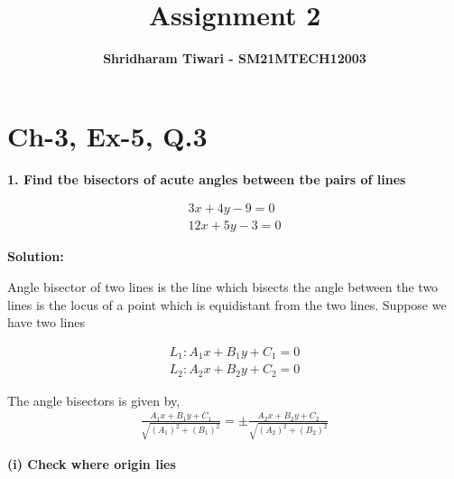 \documentclass[journal,12pt,twocolumn]{IEEEtran}
\title{\textbf{\Huge Assignment 2}}
\author{\textbf{\Large Shridharam Tiwari - SM21MTECH12003}}
\begin{document}
 



\providecommand{\mbf}{\mathbf}
\providecommand{\norm}[1]{\left\lVert#1\right\rVert}
\newcommand{\myvec}[1]{\ensuremath{\begin{pmatrix}#1\end{pmatrix}}}
\let\vec\mathbf

\maketitle



\section*{Ch-3, Ex-5, Q.3}
\vspace{0.35cm}



\textbf{1. Find tbe bisectors of acute angles between tbe pairs of
lines\\
\vspace{0.1cm} }

\begin{align}
3x+4y-9=0  \\ 12x+5y-3=0
\end{align}


\vspace{0.1cm}

\textbf{Solution:}  

\vspace{0.2cm}
Angle bisector of two lines is the line which bisects the angle between the two lines is the locus of a point which is equidistant from the two lines. Suppose we have two lines 

\begin{align}
L_1 : A_1x + B_1y + C_1 = 0 \\
L_2 : A_2x + B_2y + C_2 = 0 
\end{align}


\vspace{0.2cm} 

The angle bisectors is given by,
\begin{align}
\frac{A_1x + B_1y + C_1}{\sqrt{(A_1)^2 + (B_1)^2}} = \pm \frac{A_2x + B_2y + C_2}{\sqrt{(A_2)^2 + (B_2)^2}}
\end{align}


\vspace{0.5cm} 
\textbf{(i) Check where origin lies}
\vspace{0.5cm} 
\end{document}
